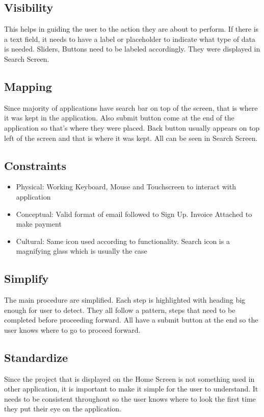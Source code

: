 \subsection{Visibility}
This helps in guiding the user to the action they are about to perform. If there is a text field, it needs to have a label or placeholder to indicate what type of data is needed. Sliders, Buttons need to be labeled accordingly. They were displayed in Search Screen.
\subsection{Mapping}
Since majority of applications have search bar on top of the screen, that is where it was kept in the application. Also submit button come at the end of the application so that's where they were placed. Back button usually appears on top left of the screen and that is where it was kept. All can be seen in Search Screen.
\subsection{Constraints}
\begin{itemize}
	\item Physical: Working Keyboard, Mouse and Touchscreen to interact with application
	\item Conceptual: Valid format of email followed to Sign Up. Invoice Attached to make payment
	\item Cultural: Same icon used according to functionality. Search icon is a magnifying glass which is usually the case
\end{itemize}
\subsection{Simplify}
The main procedure are simplified. Each step is highlighted with heading big enough for user to detect. They all follow a pattern, steps that need to be completed before proceeding forward. All have a submit button at the end so the user knows where to go to proceed forward.
\subsection{Standardize}
Since the project that is displayed on the Home Screen is not something used in other application, it is important to make it simple for the user to understand. It needs to be consistent throughout so the user knows where to look the first time they put their eye on the application.
